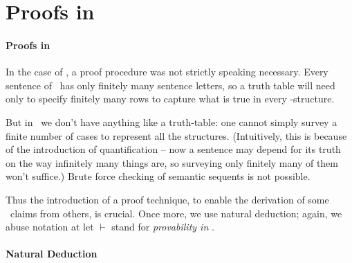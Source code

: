 
\section{Proofs in \texorpdfstring{\ltwo}{L2}}
\paragraph{Proofs in \ltwo}

In the case of \lone, a proof procedure was not strictly speaking necessary. Every sentence of \lone\ has only finitely many sentence letters, so a truth table will need only to specify finitely many rows to capture what is true in every \lone-structure.

But in \ltwo\ we don't have anything like a truth-table: one cannot simply survey a finite number of cases to represent all the structures. (Intuitively, this is because of the introduction of quantification – now a sentence may depend for its truth on the way infinitely many things are, so surveying only finitely many of them won't suffice.) Brute force checking of semantic sequents is not possible. 

Thus the introduction of a proof technique, to enable the derivation of some \ltwo\ claims from others, is crucial. Once more, we use natural deduction; again, we abuse notation at let $\vdash$ stand for \emph{provability in \ltwo}.

\paragraph{Natural Deduction}

